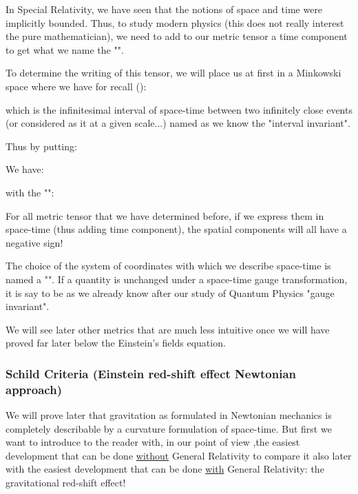 	In Special Relativity, we have seen that the notions of space and time were implicitly bounded. Thus, to study modern physics (this does not really interest  the pure mathematician), we need to add to our metric tensor a time component  to get what we name the "".
	
	To determine the writing of this tensor, we will place us at first in a Minkowski space where we have for recall ()\label{minkowski metric general relativity}:
	
	which is the infinitesimal interval of space-time between two infinitely close events (or considered as it at a given scale...) named as we know the "interval invariant".

	Thus by putting:
	
	We have:
	
	with the "":
	
	\begin{tcolorbox}[title=Remark,colframe=black,arc=10pt]
	For all metric tensor that we have determined before, if we express them in space-time (thus adding time component), the spatial components will all have a negative sign!
	\end{tcolorbox}
	The choice of the system of coordinates with which we describe space-time is named a "". If a quantity is unchanged under a space-time gauge transformation, it is say to be as we already know after our study of Quantum Physics "gauge invariant".
	
	We will see later other metrics that are much less intuitive once we will have proved far later below the Einstein's fields equation.
	
	\subsubsection{Schild Criteria (Einstein red-shift effect Newtonian approach)}
	We will prove later that gravitation as formulated in Newtonian mechanics is completely describable by a curvature formulation of space-time. But first we want to introduce to the reader with, in our point of view ,the easiest development that can be done \underline{without} General Relativity to compare it also later with the easiest development that can be done \underline{with} General Relativity: the gravitational red-shift effect!
	
